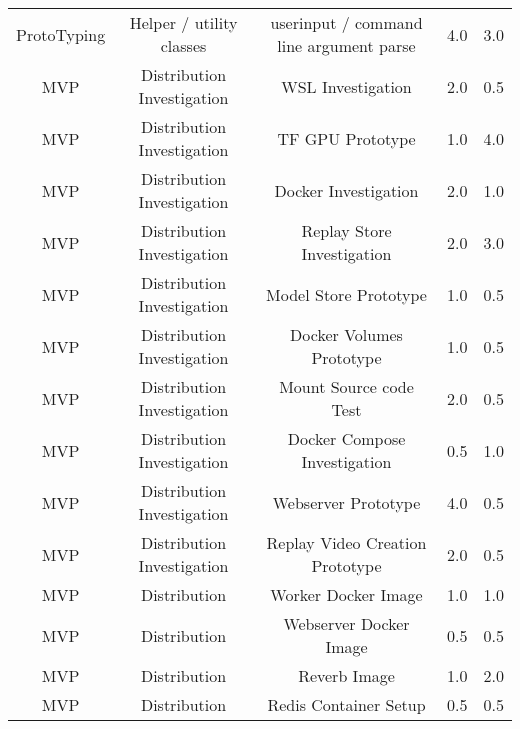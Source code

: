 \begin{longtable}{|c|c|c|c|c|}
	ProtoTyping & Helper / utility classes & userinput / command line argument parse & 4.0 & 3.0 \\
	MVP & Distribution Investigation & WSL Investigation & 2.0 & 0.5 \\
	MVP & Distribution Investigation & TF GPU Prototype & 1.0 & 4.0 \\
	MVP & Distribution Investigation & Docker Investigation & 2.0 & 1.0 \\
	MVP & Distribution Investigation & Replay Store Investigation & 2.0 & 3.0 \\
	MVP & Distribution Investigation & Model Store Prototype & 1.0 & 0.5 \\
	MVP & Distribution Investigation & Docker Volumes Prototype & 1.0 & 0.5 \\
	MVP & Distribution Investigation & Mount Source code Test & 2.0 & 0.5 \\
	MVP & Distribution Investigation & Docker Compose Investigation & 0.5 & 1.0 \\
	MVP & Distribution Investigation & Webserver Prototype & 4.0 & 0.5 \\
	MVP & Distribution Investigation & Replay Video Creation Prototype & 2.0 & 0.5 \\
	MVP & Distribution & Worker Docker Image & 1.0 & 1.0 \\
	MVP & Distribution & Webserver Docker Image & 0.5 & 0.5 \\
	MVP & Distribution & Reverb Image & 1.0 & 2.0 \\
	MVP & Distribution & Redis Container Setup  & 0.5 & 0.5 \\

\hline

\end{longtable}